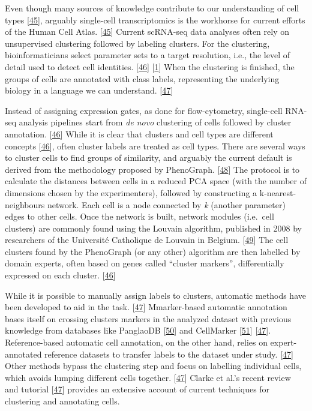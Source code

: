 Even though many sources of knowledge contribute to our understanding of cell types {[}\protect\hyperlink{ref-16phbXNJE}{45}{]}, arguably single-cell transcriptomics is the workhorse for current efforts of the Human Cell Atlas. {[}\protect\hyperlink{ref-16phbXNJE}{45}{]}
Current scRNA-seq data analyses often rely on unsupervised clustering followed by labeling clusters.
For the clustering, bioinformaticians select parameter sets to a target resolution, i.e., the level of detail used to detect cell identities. {[}\protect\hyperlink{ref-WKbly37M}{46}{]} {[}\protect\hyperlink{ref-1GmbExweg}{1}{]}
When the clustering is finished, the groups of cells are annotated with class labels, representing the underlying biology in a language we can understand. {[}\protect\hyperlink{ref-ii1dVqoy}{47}{]}

Instead of assigning expression gates, as done for flow-cytometry, single-cell RNA-seq analysis pipelines start from \emph{de novo} clustering of cells followed by cluster annotation. {[}\protect\hyperlink{ref-WKbly37M}{46}{]}
While it is clear that clusters and cell types are different concepts {[}\protect\hyperlink{ref-WKbly37M}{46}{]}, often cluster labels are treated as cell types.
There are several ways to cluster cells to find groups of similarity, and arguably the current default is derived from the methodology proposed by PhenoGraph. {[}\protect\hyperlink{ref-pEJYKNFc}{48}{]}
The protocol is to calculate the distances between cells in a reduced PCA space (with the number of dimensions chosen by the experimenters), followed by constructing a k-nearest-neighbours network.
Each cell is a node connected by \emph{k} (another parameter) edges to other cells.
Once the network is built, network modules (i.e.~cell clusters) are commonly found using the Louvain algorithm, published in 2008 by researchers of the Université Catholique de Louvain in Belgium. {[}\protect\hyperlink{ref-JpCsfe9G}{49}{]}
The cell clusters found by the PhenoGraph (or any other) algorithm are then labelled by domain experts, often based on genes called ``cluster markers'', differentially expressed on each cluster. {[}\protect\hyperlink{ref-WKbly37M}{46}{]}

While it is possible to manually assign labels to clusters, automatic methods have been developed to aid in the task. {[}\protect\hyperlink{ref-ii1dVqoy}{47}{]}
Mmarker-based automatic annotation bases itself on crossing clusters markers in the analyzed dataset with previous knowledge from databases like PanglaoDB {[}\protect\hyperlink{ref-1GezH4XNn}{50}{]} and CellMarker {[}\protect\hyperlink{ref-chGii6yw}{51}{]} {[}\protect\hyperlink{ref-ii1dVqoy}{47}{]}.
Reference-based automatic cell annotation, on the other hand, relies on expert-annotated reference datasets to transfer labels to the dataset under study. {[}\protect\hyperlink{ref-ii1dVqoy}{47}{]}
Other methods bypass the clustering step and focus on labelling individual cells, which avoids lumping different cells together. {[}\protect\hyperlink{ref-ii1dVqoy}{47}{]}
Clarke et al.'s recent review and tutorial {[}\protect\hyperlink{ref-ii1dVqoy}{47}{]} provides an extensive account of current techniques for clustering and annotating cells.

